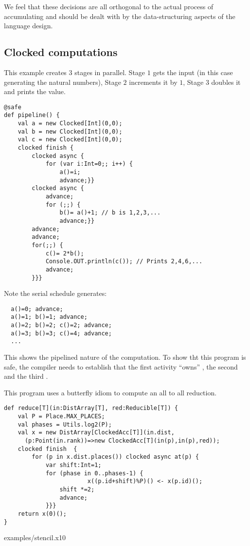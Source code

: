 We feel that these decisions are all orthogonal to the actual process
of accumulating and should be dealt with by the data-structuring
aspects of the language design.

\subsection{Clocked computations}

\begin{example}[Pipeline]
This example creates $3$ stages in parallel. Stage $1$ gets the input
(in this case generating the natural numbers), Stage $2$ increments it
by $1$, Stage $3$ doubles it and prints the value.
\begin{lstlisting}
@safe
def pipeline() {
    val a = new Clocked[Int](0,0);
    val b = new Clocked[Int](0,0);
    val c = new Clocked[Int](0,0);
    clocked finish {
        clocked async {
            for (var i:Int=0;; i++) {
                a()=i;
                advance;}}
        clocked async {
            advance;
            for (;;) {
                b()= a()+1; // b is 1,2,3,...
                advance;}}
        advance;
        advance;
        for(;;) {
            c()= 2*b();
            Console.OUT.println(c()); // Prints 2,4,6,...
            advance;
        }}}
  \end{lstlisting}
Note the serial schedule generates:
\begin{lstlisting}
  a()=0; advance;
  a()=1; b()=1; advance;
  a()=2; b()=2; c()=2; advance;
  a()=3; b()=3; c()=4; advance;
  ...
\end{lstlisting}
\noindent This shows the pipelined nature of the computation. To show
tht this program is safe, the compiler needs to establish that the
first activity ``owns'' , the second  and the third .
\end{example}

\begin{example}
This program uses a butterfly idiom to compute an all to all
reduction.
\begin{lstlisting}
def reduce[T](in:DistArray[T], red:Reducible[T]) {
    val P = Place.MAX_PLACES;
    val phases = Utils.log2(P);
    val x = new DistArray[ClockedAcc[T]](in.dist,
      (p:Point(in.rank))=>new ClockedAcc[T](in(p),in(p),red));
    clocked finish  {
        for (p in x.dist.places()) clocked async at(p) {
            var shift:Int=1;
            for (phase in 0..phases-1) {
                        x((p.id+shift)%P)() <- x(p.id)();
                shift *=2;
                advance;
            }}}
    return x(0)();
}
\end{lstlisting}
\end{example}

 {examples/stencil.x10}
